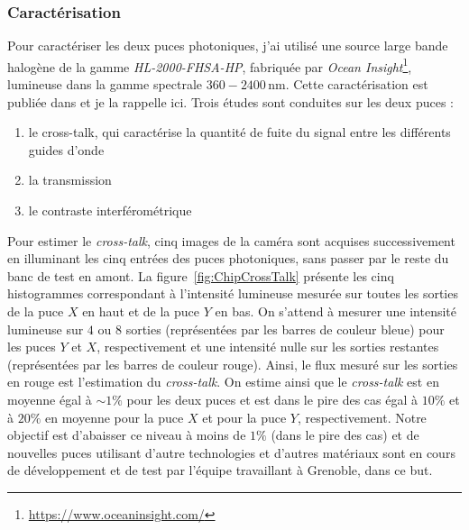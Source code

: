 \subsubsection{Caractérisation}
\label{sec:ChipCharacterization}

Pour caractériser les deux puces photoniques, j'ai utilisé une source large bande halogène de la gamme \textit{HL-2000-FHSA-HP}, fabriquée par \textit{Ocean Insight}\footnote{\url{https://www.oceaninsight.com/}}, lumineuse dans la gamme spectrale $360 - 2400 \,$nm. Cette caractérisation est publiée dans \cite{barjot2020} et je la rappelle ici. Trois études sont conduites sur les deux puces :

\begin{enumerate}
    \item le cross-talk, qui caractérise la quantité de fuite du signal entre les différents guides d'onde
    \item la transmission
    \item le contraste interférométrique
\end{enumerate}



Pour estimer le \textit{cross-talk}, cinq images de la caméra sont acquises successivement en illuminant les cinq entrées des puces photoniques, sans passer par le reste du banc de test en amont. La figure~\ref{fig:ChipCrossTalk} présente les cinq histogrammes correspondant à l'intensité lumineuse mesurée sur toutes les sorties de la puce $X$ en haut et de la puce $Y$ en bas. On s'attend à mesurer une intensité lumineuse sur $4$ ou $8$ sorties (représentées par les barres de couleur bleue) pour les puces $Y$ et $X$, respectivement et une intensité nulle sur les sorties restantes (représentées par les barres de couleur rouge). Ainsi, le flux mesuré sur les sorties en rouge est l'estimation du \textit{cross-talk}. On estime ainsi que le \textit{cross-talk} est en moyenne égal à $\sim 1\%$ pour les deux puces et est dans le pire des cas égal à $10 \%$ et à $20 \%$ en moyenne pour la puce $X$ et pour la puce $Y$, respectivement. Notre objectif est d'abaisser ce niveau à moins de $1\%$ (dans le pire des cas) et de nouvelles puces utilisant d'autre technologies et d'autres matériaux sont en cours de développement et de test par l'équipe travaillant à Grenoble, dans ce but.

